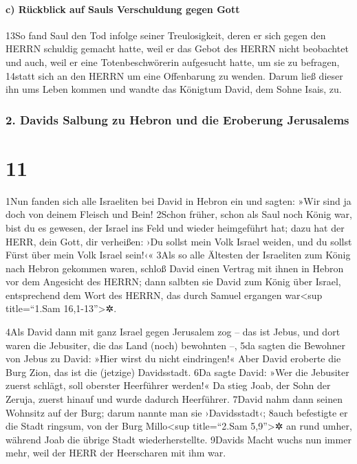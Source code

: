 \hypertarget{c-ruxfcckblick-auf-sauls-verschuldung-gegen-gott}{%
\paragraph{c) Rückblick auf Sauls Verschuldung gegen
Gott}\label{c-ruxfcckblick-auf-sauls-verschuldung-gegen-gott}}

13So fand Saul den Tod infolge seiner Treulosigkeit, deren er sich gegen
den HERRN schuldig gemacht hatte, weil er das Gebot des HERRN nicht
beobachtet und auch, weil er eine Totenbeschwörerin aufgesucht hatte, um
sie zu befragen, 14statt sich an den HERRN um eine Offenbarung zu
wenden. Darum ließ dieser ihn ums Leben kommen und wandte das Königtum
David, dem Sohne Isais, zu.

\hypertarget{davids-salbung-zu-hebron-und-die-eroberung-jerusalems}{%
\subsubsection{2. Davids Salbung zu Hebron und die Eroberung
Jerusalems}\label{davids-salbung-zu-hebron-und-die-eroberung-jerusalems}}

\hypertarget{section-10}{%
\section{11}\label{section-10}}

1Nun fanden sich alle Israeliten bei David in Hebron ein und sagten:
»Wir sind ja doch von deinem Fleisch und Bein! 2Schon früher, schon als
Saul noch König war, bist du es gewesen, der Israel ins Feld und wieder
heimgeführt hat; dazu hat der HERR, dein Gott, dir verheißen: ›Du sollst
mein Volk Israel weiden, und du sollst Fürst über mein Volk Israel
sein!‹« 3Als so alle Ältesten der Israeliten zum König nach Hebron
gekommen waren, schloß David einen Vertrag mit ihnen in Hebron vor dem
Angesicht des HERRN; dann salbten sie David zum König über Israel,
entsprechend dem Wort des HERRN, das durch Samuel ergangen
war\textless sup title=``1.Sam 16,1-13''\textgreater✲.

4Als David dann mit ganz Israel gegen Jerusalem zog -- das ist Jebus,
und dort waren die Jebusiter, die das Land (noch) bewohnten --, 5da
sagten die Bewohner von Jebus zu David: »Hier wirst du nicht
eindringen!« Aber David eroberte die Burg Zion, das ist die (jetzige)
Davidsstadt. 6Da sagte David: »Wer die Jebusiter zuerst schlägt, soll
oberster Heerführer werden!« Da stieg Joab, der Sohn der Zeruja, zuerst
hinauf und wurde dadurch Heerführer. 7David nahm dann seinen Wohnsitz
auf der Burg; darum nannte man sie ›Davidsstadt‹; 8auch befestigte er
die Stadt ringsum, von der Burg Millo\textless sup title=``2.Sam
5,9''\textgreater✲ an rund umher, während Joab die übrige Stadt
wiederherstellte. 9Davids Macht wuchs nun immer mehr, weil der HERR der
Heerscharen mit ihm war.

